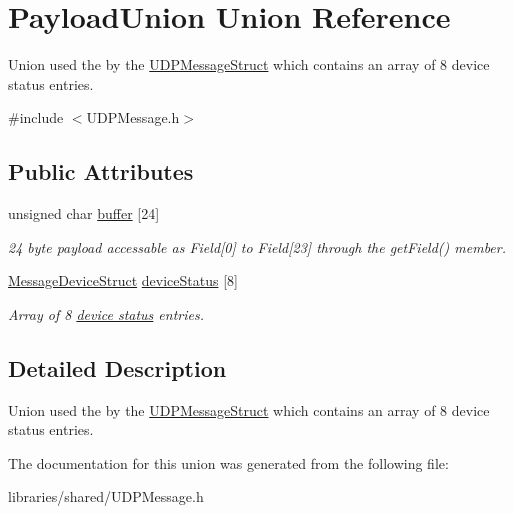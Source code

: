 \hypertarget{union_payload_union}{}\section{Payload\+Union Union Reference}
\label{union_payload_union}


Union used the by the \hyperlink{struct_u_d_p_message_struct}{U\+D\+P\+Message\+Struct} which contains an array of 8 device status entries.  




{\ttfamily \#include $<$U\+D\+P\+Message.\+h$>$}

\subsection*{Public Attributes}
\begin{DoxyCompactItemize}
\item 
\mbox{\label{union_payload_union_acd95e9d47504ae508bd341cb0383222c}} 
unsigned char \hyperlink{union_payload_union_acd95e9d47504ae508bd341cb0383222c}{buffer} \mbox{[}24\mbox{]}
\begin{DoxyCompactList}\small\item\em 24 byte payload accessable as Field\mbox{[}0\mbox{]} to Field\mbox{[}23\mbox{]} through the get\+Field() member. \end{DoxyCompactList}\item 
\mbox{\label{union_payload_union_a4f1c0490a4e4dd5136936f432772873f}} 
\hyperlink{struct_message_device_struct}{Message\+Device\+Struct} \hyperlink{union_payload_union_a4f1c0490a4e4dd5136936f432772873f}{device\+Status} \mbox{[}8\mbox{]}
\begin{DoxyCompactList}\small\item\em Array of 8 \hyperlink{struct_message_device_struct}{device status} entries. \end{DoxyCompactList}\end{DoxyCompactItemize}


\subsection{Detailed Description}
Union used the by the \hyperlink{struct_u_d_p_message_struct}{U\+D\+P\+Message\+Struct} which contains an array of 8 device status entries. 

The documentation for this union was generated from the following file\+:\begin{DoxyCompactItemize}
\item 
libraries/shared/U\+D\+P\+Message.\+h\end{DoxyCompactItemize}

